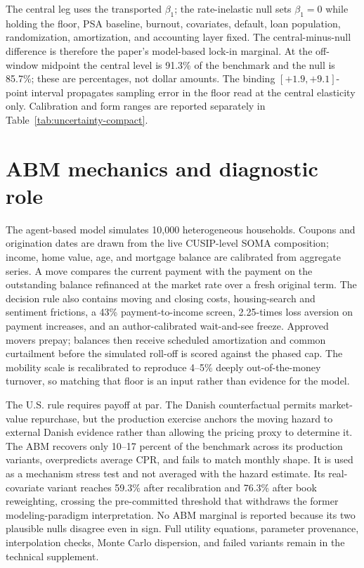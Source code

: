 \documentclass[12pt]{article}
\begin{document}
The central leg uses the transported $\beta_1$; the rate-inelastic null sets
$\beta_1=0$ while holding the floor, PSA baseline, burnout, covariates, default,
loan population, randomization, amortization, and accounting layer fixed. The
central-minus-null difference is therefore the paper's model-based lock-in
marginal. At the off-window midpoint the central level is 91.3\% of the
benchmark and the null is 85.7\%; these are percentages, not dollar amounts.
The binding $[+1.9,+9.1]$-point interval propagates sampling error in the floor
read at the central elasticity only. Calibration and form ranges are reported
separately in Table~\ref{tab:uncertainty-compact}.

\section{ABM mechanics and diagnostic role}\label{sec:method-abm}
\label{sec:method-frictions}\label{app:abmspec}

The agent-based model simulates 10{,}000 heterogeneous households. Coupons and
origination dates are drawn from the live CUSIP-level SOMA composition; income,
home value, age, and mortgage balance are calibrated from aggregate series. A
move compares the current payment with the payment on the outstanding balance
refinanced at the market rate over a fresh original term. The decision rule also
contains moving and closing costs, housing-search and sentiment frictions, a
43\% payment-to-income screen, 2.25-times loss aversion on payment increases,
and an author-calibrated wait-and-see freeze. Approved movers prepay; balances
then receive scheduled amortization and common curtailment before the simulated
roll-off is scored against the phased cap. The mobility scale is recalibrated to
reproduce 4--5\% deeply out-of-the-money turnover, so matching that floor is an
input rather than evidence for the model.

The U.S. rule requires payoff at par. The Danish counterfactual permits
market-value repurchase, but the production exercise anchors the moving hazard
to external Danish evidence rather than allowing the pricing proxy to determine
it. The ABM recovers only 10--17 percent of the benchmark across its production
variants, overpredicts average CPR, and fails to match monthly shape. It is used
as a mechanism stress test and not averaged with the hazard estimate. Its
real-covariate variant reaches 59.3\% after recalibration and 76.3\% after book
reweighting, crossing the pre-committed threshold that withdraws the former
modeling-paradigm interpretation. No ABM marginal is reported because its two
plausible nulls disagree even in sign. Full utility equations, parameter
provenance, interpolation checks, Monte Carlo dispersion, and failed variants
remain in the technical supplement.
\end{document}
